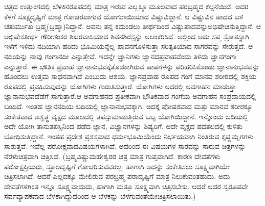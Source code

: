 {ಚಿತ್ರದ ಉತ್ತುಂಗದಲ್ಲಿ ಬೆಳಕಿನರೂಪದಲ್ಲಿ ಮಾತ್ರ ಇರುವ ಎಲ್ಲಕ್ಕೂ ಮೂಲವಾದ ಪರಬ್ರಹ್ಮದ ಕಲ್ಪನೆಯಿದೆ. ಅದರ ಕೆಳಗೆ ಸೂಕ್ಷ್ಮದೃಷ್ಟಿಗೆ ಮಾತ್ರ ಗೋಚರವಾಗುವ ಯೋಗಶಾಯಿಯಾದ ವಿಷ್ಣುವಿದ್ದಾನೆ. ಆ ವಿಷ್ಣುವಿನ ಪಾದದ ಬಳಿ ಚತುರ್ಮುಖ ಬ್ರಹ್ಮ(ಬ್ರಹ್ಮಾ)ನಿದ್ದಾನೆ. ಅವನು ತನ್ನ ಕಮಂಡಲು ತೀರ್ಥದಿಂದ ವಿಷ್ಣುಪಾದವನ್ನು\break ಅಭಿಷೇಚಿಸುತ್ತಿದ್ದಾನೆ. ಆ ಅಭಿಷೇಕತೀರ್ಥ ಗೌರೀಶಂಕರ ಶಿಖರವಾಸಿಯಾದ ಶಿವನ\break ಶಿರಸ್ಸನ್ನು ಅಲಂಕರಿಸಿದೆ. ಅಲ್ಲಿಂದ ಅದು ಸಪ್ತ ಸ್ರೋತಸ್ಸಾಗಿ ಇಳೆಗೆ ಇಳಿದು ನದಿಯಾಗಿ ಹರಿದು ಭೂಮಿಯನ್ನೆಲ್ಲ ಪಾವನಗೊಳಿಸುತ್ತಾ ಸರಿತ್ಪತಿಯಾದ ಸಾಗರವನ್ನು ಸೇರುತ್ತದೆ. ಆ ನದಿಯನ್ನು ನಾವು ಗಂಗಾನದೀ ಎನ್ನುತ್ತೇವೆ. ಇದನ್ನೇ ಜ್ಞಾನಿಗಳು ಜ್ಞಾನದ\break ಪ್ರವಾಹವೆಂದು ತಿಳಿದು ಜ್ಞಾನಗಂಗಾ ಎನ್ನುತ್ತಾರೆ. ಈ ಭೌತಿಕ ಪ್ರವಾಹ ಜ್ಞಾನಾನುಭವಕ್ಕೆ\break ತೊಡಕಾಗಿರುವ ಪಾಪಗಳನ್ನು ಪರಿಹರಿಸಿಕೊಂಡು ಜ್ಞಾನಾನುಭವವನ್ನು ಹೊಂದಲು ಉತ್ತಮ ಸಾಧನವಾಗಿದೆ \enginline{-} ಎಂಬುದು ಆಶಯ.  ಜ್ಞಾನಪ್ರವಾಹ ರೂಪದ ಗಂಗೆ ಮಾನವ ಶರೀರದಲ್ಲಿ ಶಕ್ತಿಯ ರೂಪದಲ್ಲಿ ಪ್ರವಹಿಸುವುದನ್ನು ಯೋಗಿಗಳು ಗುರುತಿಸುತ್ತಾರೆ. ಯೋಗಿಗಳು ಅದರಲ್ಲಿ ಅವಗಾಹನ ಮಾಡುತ್ತಾ ಜ್ಞಾನಾನುಭವದೆಡೆಗೆ ಸಾಗುತ್ತಾರೆ.\break ಆ ಅವಗಾಹನದ ಪ್ರತೀಕವಾಗಿ ಭೌತಿಕವಾದ ಗಂಗೆಯ ಅವಗಾಹನ ಸಂಪ್ರದಾಯದಲ್ಲಿ ಬಂದಿದೆ. ಇಂತಹ ಜ್ಞಾನನದಿಯ ಬದಿಯಲ್ಲಿ ಜ್ಞಾನಾನುಭವಕ್ಕಾಗಿ, ಅದಕ್ಕೆ ಪೋಷಕವಾದ ಮತ್ತು ಮಾನವ ಶರೀರಕ್ಕೂ ಸಂಕೇತವಾದ ಅಶ್ವತ್ಥ ವೃಕ್ಷದ ಮೂಲದಲ್ಲಿ ತಪಸ್ಸು\-ಮಾಡುತ್ತಿರುವ ಒಬ್ಬ ಯೋಗಿಯಿದ್ದಾನೆ. ಇನ್ನೊಂದು ಬದಿಯಲ್ಲಿ ಅದೇ ಯೋಗಿ ತಾನು\break ತಪಸ್ಸಿನಿಂದ ಪಡೆದ ಜ್ಞಾನ, ವಿಜ್ಞಾನಗಳನ್ನು ಶಿಷ್ಯರಿಗೆ, ಅದೇ ವೃಕ್ಷದ ಪದತಲದಲ್ಲಿ ಕುಳಿತು ಬೋಧಿಸುತ್ತಿದ್ದಾನೆ. ಇಂತಹ ಪ್ರದೇಶ ಪ್ರಶಸ್ತವಾದ \hbox{ಧರ್ಮಭೂಮಿಯೆಂದು} ನಿರ್ಭಯವಾಗಿ ನಿಂತಿರುವ ಕೃಷ್ಣಮೃಗಗಳು ಸಾರುತ್ತವೆ. ಇವೆಲ್ಲ ಪರೋಕ್ಷವಾದ\break ವಿಷಯಗಳಾಗಿವೆ. ಅದರಿಂದ ಈ ವಿಷಯಗಳ ಸಾರವನ್ನು ಸಾರುವ ಚಿತ್ರಗಳನ್ನು ನೆರಳು\break ಚಿತ್ರವಾಗಿ ಚಿತ್ರಿಸಿದೆ. (ಬ್ರಹ್ಮ\enginline{-}ವಿಷ್ಣು\enginline{-}ಮಹೇಶ್ವರರ ಚಿತ್ರ ಮಾತ್ರ ಗುಪ್ತವಾಗಿದೆ. ಕಾರಣ ದೇವತೆಗಳು ಪರೋಕ್ಷಪ್ರಿಯರು, ಸ್ಥೂಲದೃಷ್ಟಿಗೆ ಗೋಚರಿಸುವವರಲ್ಲ. ಹಾಗಾಗಿ ಅದನ್ನು ಸಂಕೇತಿಸಲು ಸೂಕ್ಷ್ಮವಾಗಿಯೇ ಚಿತ್ರಿಸಲಾಗಿದೆ. ಆದರೆ ಎಲ್ಲದಕ್ಕೂ ಮೇಲಿರುವ ಪರಬ್ರಹ್ಮ ಪರಾದೃಷ್ಟಿಗೆ ಮಾತ್ರ ನಿಲುಕುವಂತಹುದು. ಅದು ದೇವತೆಗಳಿಗಿಂತ ಇನ್ನೂ ಸೂಕ್ಷ್ಮವಾದುದು, ಹಾಗಾಗಿ ಮತ್ತೂ ಸೂಕ್ಷ್ಮವಾಗಿ ಚಿತ್ರಿಸಬೇಕು. ಆದರೆ ಅದರ ಸ್ವರೂಪವೇ ಸರ್ವವ್ಯಾಪಕವಾದ ಬೆಳಕಾಗಿದ್ದುದರಿಂದ  ಆ ಬೆಳಕನ್ನು ಬೆಳಗುವಂತೆಯೇ\break ಚಿತ್ರಿಸಲಾಯಿತು.)\break
}
